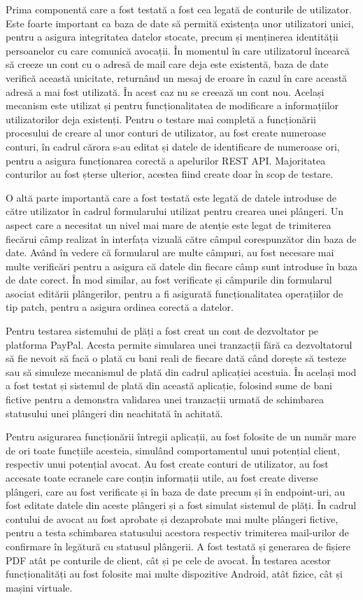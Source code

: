 \documentclass[12pt,a4paper]{report}
\theoremstyle{definition}
\theoremstyle{remark}
\begin{document}
Prima componentă care a fost testată a fost cea legată de conturile de utilizator. Este foarte important ca baza de date să permită existența unor utilizatori unici, pentru a asigura integritatea datelor stocate, precum și menținerea identității persoanelor cu care comunică avocații. În momentul în care utilizatorul încearcă să creeze un cont cu o adresă de mail care deja este existentă, baza de date verifică această unicitate, returnând un mesaj de eroare în cazul în care această adresă a mai fost utilizată. În acest caz nu se creează un cont nou. Același mecanism este utilizat și pentru funcționalitatea de modificare a informațiilor utilizatorilor deja existenți. Pentru o testare mai completă a funcționării procesului de creare al unor conturi de utilizator, au fost create numeroase conturi, în cadrul cărora s-au editat și datele de identificare de numeroase ori, pentru a asigura funcționarea corectă a apelurilor REST API. Majoritatea conturilor au fost șterse ulterior, acestea fiind create doar în scop de testare.

O altă parte importantă care a fost testată este legată de datele introduse de către utilizator în cadrul formularului utilizat pentru crearea unei plângeri. Un aspect care a necesitat un nivel mai mare de atenție este legat de trimiterea fiecărui câmp realizat în interfața vizuală către câmpul corespunzător din baza de date. Având în vedere că formularul are multe câmpuri, au fost necesare mai multe verificări pentru a asigura că datele din fiecare câmp sunt introduse în baza de date corect. În mod similar, au fost verificate și câmpurile din formularul asociat editării plângerilor, pentru a fi asigurată funcționalitatea operațiilor de tip patch, pentru a asigura ordinea corectă a datelor. 

Pentru testarea sistemului de plăți a fost creat un cont de dezvoltator pe platforma PayPal. Acesta permite simularea unei tranzacții fără ca dezvoltatorul să fie nevoit să facă o plată cu bani reali de fiecare dată când dorește să testeze sau să simuleze mecanismul de plată din cadrul aplicației acestuia. În același mod a fost testat și sistemul de plată din această aplicație, folosind sume de bani fictive pentru a demonstra validarea unei tranzacții urmată de schimbarea statusului unei plângeri din neachitată în achitată.

Pentru asigurarea funcționării întregii aplicații, au fost folosite de un număr mare de ori toate funcțiile acesteia, simulând comportamentul unui potențial client, respectiv unui potențial avocat. Au fost create conturi de utilizator, au fost accesate toate ecranele care conțin informații utile, au fost create diverse plângeri, care au fost verificate și în baza de date precum și în endpoint-uri, au fost editate datele din aceste plângeri și a fost simulat sistemul de plăți. În cadrul contului de avocat au fost aprobate și dezaprobate mai multe plângeri fictive, pentru a testa schimbarea statusului acestora respectiv trimiterea mail-urilor de confirmare în legătură cu statusul plângerii. A fost testată și generarea de fișiere PDF atât pe conturile de client, cât și pe cele de avocat. În testarea acestor funcționalități au fost folosite mai multe dispozitive Android, atât fizice, cât și mașini virtuale. 
\newpage
\end{document}

